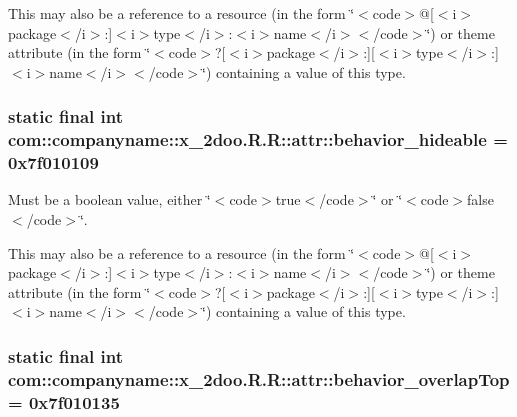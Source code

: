 This may also be a reference to a resource (in the form \char`\"{}$<$code$>$@\mbox{[}$<$i$>$package$<$/i$>$:\mbox{]}$<$i$>$type$<$/i$>$:$<$i$>$name$<$/i$>$$<$/code$>$\char`\"{}) or theme attribute (in the form \char`\"{}$<$code$>$?\mbox{[}$<$i$>$package$<$/i$>$:\mbox{]}\mbox{[}$<$i$>$type$<$/i$>$:\mbox{]}$<$i$>$name$<$/i$>$$<$/code$>$\char`\"{}) containing a value of this type. \hypertarget{classcom_1_1companyname_1_1x__2doo_1_1_r_1_1attr_684fba60aba8261fc57b84ed51f99343}{
\subsubsection[{behavior\_\-hideable}]{\setlength{\rightskip}{0pt plus 5cm}static final int com::companyname::x\_\-2doo.R.R::attr::behavior\_\-hideable = 0x7f010109}}
\label{classcom_1_1companyname_1_1x__2doo_1_1_r_1_1attr_684fba60aba8261fc57b84ed51f99343}


Must be a boolean value, either \char`\"{}$<$code$>$true$<$/code$>$\char`\"{} or \char`\"{}$<$code$>$false$<$/code$>$\char`\"{}. 

This may also be a reference to a resource (in the form \char`\"{}$<$code$>$@\mbox{[}$<$i$>$package$<$/i$>$:\mbox{]}$<$i$>$type$<$/i$>$:$<$i$>$name$<$/i$>$$<$/code$>$\char`\"{}) or theme attribute (in the form \char`\"{}$<$code$>$?\mbox{[}$<$i$>$package$<$/i$>$:\mbox{]}\mbox{[}$<$i$>$type$<$/i$>$:\mbox{]}$<$i$>$name$<$/i$>$$<$/code$>$\char`\"{}) containing a value of this type. \hypertarget{classcom_1_1companyname_1_1x__2doo_1_1_r_1_1attr_92006eaab09d34ac9cd493afc42a15cc}{
\subsubsection[{behavior\_\-overlapTop}]{\setlength{\rightskip}{0pt plus 5cm}static final int com::companyname::x\_\-2doo.R.R::attr::behavior\_\-overlapTop = 0x7f010135}}
\label{classcom_1_1companyname_1_1x__2doo_1_1_r_1_1attr_92006eaab09d34ac9cd493afc42a15cc}


